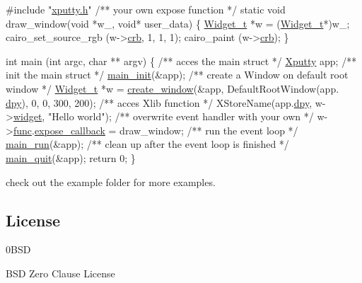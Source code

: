 \begin{DoxyCode}
\textcolor{preprocessor}{#include "\hyperlink{xputty_8h}{xputty.h}"}
\textcolor{comment}{}
\textcolor{comment}{/** your own expose function */}
\textcolor{keyword}{static} \textcolor{keywordtype}{void} draw\_window(\textcolor{keywordtype}{void} *w\_, \textcolor{keywordtype}{void}* user\_data) \{
    \hyperlink{structWidget__t}{Widget\_t} *w = (\hyperlink{structWidget__t}{Widget\_t}*)w\_;
    cairo\_set\_source\_rgb (w->\hyperlink{structWidget__t_ad98022ee160d4c0906110868fc9e5664}{crb}, 1, 1, 1);
    cairo\_paint (w->\hyperlink{structWidget__t_ad98022ee160d4c0906110868fc9e5664}{crb});
\}

\textcolor{keywordtype}{int} main (\textcolor{keywordtype}{int} argc, \textcolor{keywordtype}{char} ** argv)
\{\textcolor{comment}{}
\textcolor{comment}{    /** acces the main struct */}
    \hyperlink{structXputty}{Xputty} app;\textcolor{comment}{}
\textcolor{comment}{    /** init the main struct */}
    \hyperlink{xputty_8c_a484645d624d9e9eff0288f8d5583ff5e}{main\_init}(&app);\textcolor{comment}{}
\textcolor{comment}{    /** create a Window on default root window */}
    \hyperlink{structWidget__t}{Widget\_t} *w = \hyperlink{xwidget_8c_a5528f841e6b5f2ef62b3b10bfa8bf20f}{create\_window}(&app, DefaultRootWindow(app.
      \hyperlink{structXputty_ab185ae4fd00ee1930c61e0440734878f}{dpy}), 0, 0, 300, 200);\textcolor{comment}{}
\textcolor{comment}{    /** acces Xlib function */}
    XStoreName(app.\hyperlink{structXputty_ab185ae4fd00ee1930c61e0440734878f}{dpy}, w->\hyperlink{structWidget__t_acb2bfb41674371ee1220a9d6a2d89fb1}{widget}, \textcolor{stringliteral}{"Hello world"});\textcolor{comment}{}
\textcolor{comment}{    /** overwrite event handler with your own */}
    w->\hyperlink{structWidget__t_a225b9a175e132994a5aa73b59a2911ad}{func}.\hyperlink{structFunc__t_ae4ba307ec29bfea83e1197aa750c1396}{expose\_callback} = draw\_window;\textcolor{comment}{}
\textcolor{comment}{    /** run the event loop */}
    \hyperlink{xputty_8c_abb548ea64f852a7c94473a595e67d69f}{main\_run}(&app);\textcolor{comment}{}
\textcolor{comment}{    /** clean up after the event loop is finished */}
    \hyperlink{xputty_8c_a0d4eda902b4de6f7a30e8d869f842fda}{main\_quit}(&app);
    \textcolor{keywordflow}{return} 0;
\}
\end{DoxyCode}


check out the example folder for more examples.

\subsection*{License}

\begin{DoxyVerb}     0BSD 
\end{DoxyVerb}
 B\+SD Zero Clause License 